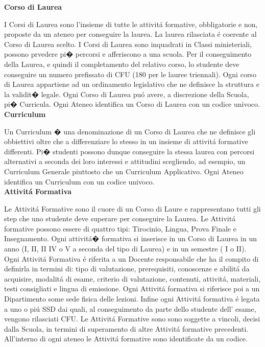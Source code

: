 \documentclass[a4paper,12pt,italian,towside]{article}
\begin{document}
\textbf{Corso di Laurea}
\par
I Corsi di Laurea sono l'insieme di tutte le attivit\'a formative, obbligatorie e non, proposte da un ateneo per conseguire la laurea. La laurea rilasciata \'e coerente al Corso di Laurea scelto. I Corsi di Laurea sono inquadrati in Classi ministeriali, possono prvedere pi� percorsi e afferiscono a una scuola. Per il conseguimento della Laurea, e quindi il completamento del relativo corso, lo studente deve conseguire un numero prefissato di CFU (180 per le lauree triennali). Ogni corso di Laurea appartiene ad un ordinamento legislativo che ne definisce la struttura e la validit� legale. Ogni Corso di Laurea pu\'o avere, a discrezione della Scuola, pi� Curricula. Ogni Ateneo identifica un Corso di Laurea con un codice univoco.\\


\textbf{Curriculum}
\par
Un Curriculum � una denominazione di un Corso di Laurea che ne definisce gli obbiettivi oltre che a differenziare lo stesso in un insieme di attivit\'a formative differenti. Pi� studenti possono dunque conseguire la stessa laurea con percorsi alternativi a seconda dei loro interessi e attitudini scegliendo, ad esempio, un Curriculum Generale piuttosto che un Curriculum Applicativo.
Ogni Ateneo identifica un Curriculum con un codice univoco.\\


\textbf{Attivit\'a Formativa}
\par
Le Attivit\'a Formative sono il cuore di un Corso di Laure e rappresentano tutti gli step che uno studente deve superare per conseguire la Laurea. Le Attivit\'a formative possono essere di quattro tipi: Tirocinio, Lingua, Prova Finale e Insegnamento. Ogni attivit\'a� formativa si inserisce in un Corso di Laurea in un anno (I, II, II IV o V a seconda del tipo di Laurea) e in un semestre ( I o II). Ogni Attivit\'a Formativa \'e riferita a un Docente responsabile che ha il compito di definirla in termini di: tipo di valutazione, prerequisiti, conoscenze e abilit\'a da acquisire, modalit\'a di esame, criterio di valutazione, contenuti, attivit\'a, materiali, testi consigliati e lingua di emissione. Ogni Attivit\'a formativa si riferisce poi a un Dipartimento some sede fisica delle lezioni. Infine ogni Attivit\'a formativa \'e legata a uno o pi\'u SSD dai quali, al conseguimento da parte dello studente dell' esame, vengono rilasciati CFU. Le Attivit\'a Formative sono sono soggette a vincoli, decisi dalla Scuola, in termini di superamento di altre Attivit\'a formative precedenti. All'interno di ogni ateneo le Attivit\'a formative sono identificate da un codice.\\
\end{document}
